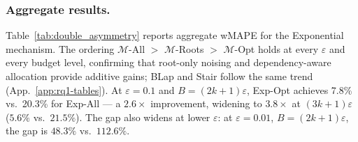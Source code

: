 
\subsubsection{Aggregate results.}
Table~\ref{tab:double_asymmetry} reports aggregate wMAPE for the Exponential mechanism. The ordering $\mathcal{M}$-All $>$ $\mathcal{M}$-Roots $>$ $\mathcal{M}$-Opt holds at every $\varepsilon$ and every budget level, confirming that root-only noising and dependency-aware allocation provide additive gains; BLap and Stair follow the same trend (App.~\ref{app:rq1-tables}). At $\varepsilon = 0.1$ and $B = (2k{+}1)\varepsilon$, Exp-Opt achieves 7.8\% vs.\ 20.3\% for Exp-All --- a $2.6\times$ improvement, widening to $3.8\times$ at $(3k{+}1)\varepsilon$ ($5.6\%$ vs.\ $21.5\%$). The gap also widens at lower $\varepsilon$: at $\varepsilon = 0.01$, $B = (2k{+}1)\varepsilon$, the gap is $48.3\%$ vs.\ $112.6\%$.

 
 


